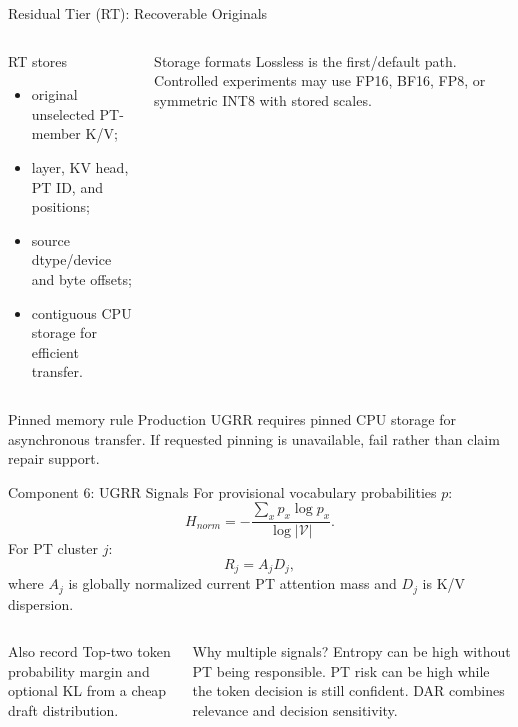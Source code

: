 \documentclass[aspectratio=169,10pt]{beamer}
\newcommand{\tightitems}{\setlength{\itemsep}{0.28em}\setlength{\parskip}{0pt}}
\begin{document}
\begin{frame}{Residual Tier (RT): Recoverable Originals}
\small
\begin{columns}[T,onlytextwidth]
\begin{block}{RT stores}
\begin{itemize}\tightitems
  \item original unselected PT-member K/V;
  \item layer, KV head, PT ID, and positions;
  \item source dtype/device and byte offsets;
  \item contiguous CPU storage for efficient transfer.
\end{itemize}
\end{block}
\begin{block}{Storage formats}
Lossless is the first/default path. Controlled experiments may use FP16, BF16, FP8, or symmetric
INT8 with stored scales.
\end{block}
\end{columns}
\begin{alertblock}{Pinned memory rule}
Production UGRR requires pinned CPU storage for asynchronous transfer. If requested pinning is
unavailable, fail rather than claim repair support.
\end{alertblock}
\end{frame}

\begin{frame}{Component 6: UGRR Signals}
\scriptsize
For provisional vocabulary probabilities $p$:
\[
H_{norm}=-\frac{\sum_xp_x\log p_x}{\log|\mathcal V|}.
\]
For PT cluster $j$:
\[
R_j=A_jD_j,
\]
where $A_j$ is globally normalized current PT attention mass and $D_j$ is K/V dispersion.
\begin{columns}[T,onlytextwidth]
\begin{block}{Also record}
Top-two token probability margin and optional KL from a cheap draft distribution.
\end{block}
\begin{alertblock}{Why multiple signals?}
Entropy can be high without PT being responsible. PT risk can be high while the token decision is
still confident. DAR combines relevance and decision sensitivity.
\end{alertblock}
\end{columns}
\end{frame}
\end{document}
